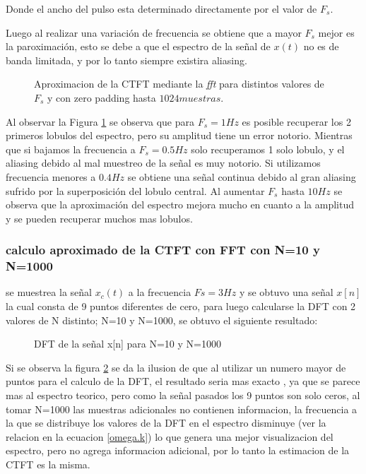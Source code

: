 \documentclass[11pt,a4paper]{article}
\begin{document}
Donde el ancho del pulso esta determinado directamente por el valor de $F_s$.

Luego al realizar una variación de frecuencia se obtiene que a mayor $F_s$ mejor es la paroximación, esto se debe a que el espectro de la 
señal de $x(t)$ no es de banda limitada, y por lo tanto siempre existira aliasing.  

\begin{figure}[H]
    \centering
    \caption{Aproximacion de la CTFT mediante la \textit{fft} para distintos valores de $F_s$ y con zero padding hasta $1024muestras$.}
    \label{fig.4d}
\end{figure}

Al observar la Figura \ref{fig.4d} se observa que para $F_s=1Hz$ es posible recuperar los 2 primeros lobulos del espectro, pero su amplitud 
tiene un error notorio. Mientras que si bajamos la frecuencia a $F_s=0.5Hz$ solo recuperamos 1 solo lobulo, y el aliasing debido al mal muestreo de 
la señal es muy notorio. Si utilizamos frecuencia menores a $0.4Hz$ se obtiene una señal continua debido al gran aliasing sufrido por la superposición
del lobulo central. Al aumentar $F_s$ hasta $10Hz$ se observa que la aproximación del espectro mejora mucho en cuanto a la amplitud y se pueden recuperar 
muchos mas lobulos.

 \subsubsection*{calculo aproximado de la CTFT con FFT con N=10 y N=1000}
 se muestrea la señal $x_{c}(t)$ a la frecuencia $Fs=3 Hz$ y se obtuvo una señal $x[n]$ la cual consta de 9 puntos diferentes de cero, para luego calcularse la DFT con 2 valores de N distinto; N=10 y N=1000, se obtuvo el siguiente resultado:
 \begin{figure}
 \centering
     \caption{DFT de la señal x[n] para N=10 y N=1000}
     \label{fig.4e}
 \end{figure} 
 Si se observa la figura \ref{fig.4e} se da la ilusion de que al utilizar un numero mayor de puntos para el calculo de la DFT, el resultado seria mas exacto , ya que se parece mas al espectro teorico, pero como la señal pasados los 9 puntos son solo ceros, al tomar N=1000 las muestras adicionales no contienen informacion, la frecuencia a la que se distribuye los valores de la DFT en el espectro disminuye (ver la relacion en la ecuacion \ref{omega.k})
 lo que genera una mejor visualizacion del espectro, pero no agrega informacion adicional, por lo tanto la estimacion de la CTFT es la misma.
\end{document}
